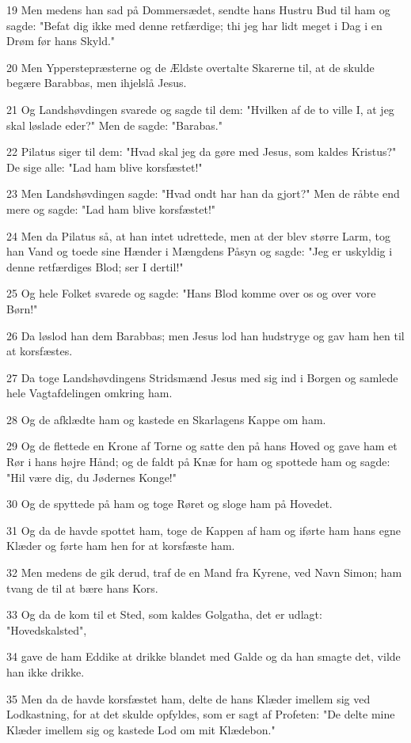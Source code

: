 \par 19 Men medens han sad på Dommersædet, sendte hans Hustru Bud til ham og sagde: "Befat dig ikke med denne retfærdige; thi jeg har lidt meget i Dag i en Drøm før hans Skyld."
\par 20 Men Ypperstepræsterne og de Ældste overtalte Skarerne til, at de skulde begære Barabbas, men ihjelslå Jesus.
\par 21 Og Landshøvdingen svarede og sagde til dem: "Hvilken af de to ville I, at jeg skal løslade eder?" Men de sagde: "Barabas."
\par 22 Pilatus siger til dem: "Hvad skal jeg da gøre med Jesus, som kaldes Kristus?" De sige alle: "Lad ham blive korsfæstet!"
\par 23 Men Landshøvdingen sagde: "Hvad ondt har han da gjort?" Men de råbte end mere og sagde: "Lad ham blive korsfæstet!"
\par 24 Men da Pilatus så, at han intet udrettede, men at der blev større Larm, tog han Vand og toede sine Hænder i Mængdens Påsyn og sagde: "Jeg er uskyldig i denne retfærdiges Blod; ser I dertil!"
\par 25 Og hele Folket svarede og sagde: "Hans Blod komme over os og over vore Børn!"
\par 26 Da løslod han dem Barabbas; men Jesus lod han hudstryge og gav ham hen til at korsfæstes.
\par 27 Da toge Landshøvdingens Stridsmænd Jesus med sig ind i Borgen og samlede hele Vagtafdelingen omkring ham.
\par 28 Og de afklædte ham og kastede en Skarlagens Kappe om ham.
\par 29 Og de flettede en Krone af Torne og satte den på hans Hoved og gave ham et Rør i hans højre Hånd; og de faldt på Knæ for ham og spottede ham og sagde: "Hil være dig, du Jødernes Konge!"
\par 30 Og de spyttede på ham og toge Røret og sloge ham på Hovedet.
\par 31 Og da de havde spottet ham, toge de Kappen af ham og iførte ham hans egne Klæder og førte ham hen for at korsfæste ham.
\par 32 Men medens de gik derud, traf de en Mand fra Kyrene, ved Navn Simon; ham tvang de til at bære hans Kors.
\par 33 Og da de kom til et Sted, som kaldes Golgatha, det er udlagt: "Hovedskalsted",
\par 34 gave de ham Eddike at drikke blandet med Galde og da han smagte det, vilde han ikke drikke.
\par 35 Men da de havde korsfæstet ham, delte de hans Klæder imellem sig ved Lodkastning, for at det skulde opfyldes, som er sagt af Profeten: "De delte mine Klæder imellem sig og kastede Lod om mit Klædebon."

